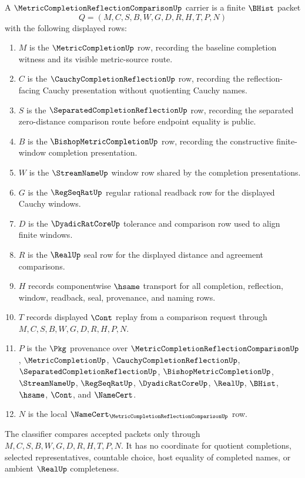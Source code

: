 \begin{definition}
\label{def:metric-completion-reflection-comparison-carrier}
A $\MetricCompletionReflectionComparisonUp$ carrier is a finite $\BHist$ packet
$$
Q=(M,C,S,B,W,G,D,R,H,T,P,N)
$$
with the following displayed rows:
\begin{enumerate}
\item $M$ is the $\MetricCompletionUp$ row, recording the baseline completion witness and its visible metric-source route.
\item $C$ is the $\CauchyCompletionReflectionUp$ row, recording the reflection-facing Cauchy presentation without quotienting Cauchy names.
\item $S$ is the $\SeparatedCompletionReflectionUp$ row, recording the separated zero-distance comparison route before endpoint equality is public.
\item $B$ is the $\BishopMetricCompletionUp$ row, recording the constructive finite-window completion presentation.
\item $W$ is the $\StreamNameUp$ window row shared by the completion presentations.
\item $G$ is the $\RegSeqRatUp$ regular rational readback row for the displayed Cauchy windows.
\item $D$ is the $\DyadicRatCoreUp$ tolerance and comparison row used to align finite windows.
\item $R$ is the $\RealUp$ seal row for the displayed distance and agreement comparisons.
\item $H$ records componentwise $\hsame$ transport for all completion, reflection, window, readback, seal, provenance, and naming rows.
\item $T$ records displayed $\Cont$ replay from a comparison request through $M,C,S,B,W,G,D,R,H,P,N$.
\item $P$ is the $\Pkg$ provenance over $\MetricCompletionReflectionComparisonUp$, $\MetricCompletionUp$, $\CauchyCompletionReflectionUp$, $\SeparatedCompletionReflectionUp$, $\BishopMetricCompletionUp$, $\StreamNameUp$, $\RegSeqRatUp$, $\DyadicRatCoreUp$, $\RealUp$, $\BHist$, $\hsame$, $\Cont$, and $\NameCert$.
\item $N$ is the local $\NameCert_{\MetricCompletionReflectionComparisonUp}$ row.
\end{enumerate}
The classifier compares accepted packets only through $M,C,S,B,W,G,D,R,H,T,P,N$. It has no coordinate for quotient completions, selected representatives, countable choice, host equality of completed names, or ambient $\RealUp$ completeness.
\end{definition}


